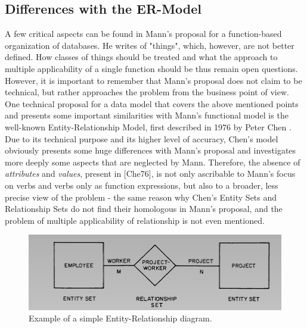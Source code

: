 \subsection{Differences with the ER-Model}
A few critical aspects can be found in Mann's proposal for a function-based organization of databases. He writes of "things", which, however, are not better defined. How classes of things should be treated and what the approach to multiple applicability of a single function should be thus remain open questions. However, it is important to remember that Mann's proposal does not claim to be technical, but rather approaches the problem from the business point of view. One technical proposal for a data model that covers the above mentioned points and presents some important similarities with Mann's functional model is the well-known Entity-Relationship Model, first described in 1976 by Peter Chen \cite{che76}. Due to its technical purpose and its higher level of accuracy, Chen's model obviously presents some huge differences with Mann's proposal and investigates more deeply some aspects that are neglected by Mann. Therefore, the absence of \textit{attributes} and \textit{values}, present in [Che76], is not only ascribable to Mann's focus on verbs and verbs only as function expressions, but also to a broader, less precise view of the problem - the same reason why Chen's Entity Sets and Relationship Sets do not find their homologous in Mann's proposal, and the problem of multiple applicability of relationship is not even mentioned. 
\begin{figure}
	\centering
	\includegraphics[width=\textwidth]{pic2.png}
	\caption{Example of a simple Entity-Relationship diagram. \cite{che76}}
\end{figure}

